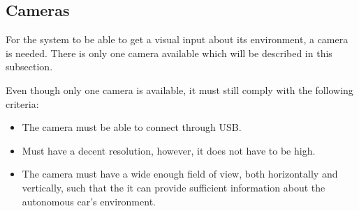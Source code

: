 \subsection{Cameras}\label{ssec:cameras}
For the system to be able to get a visual input about its environment, a camera is needed.
There is only one camera available which will be described in this subsection.

Even though only one camera is available, it must still comply with the following criteria:
\begin{itemize}
  \item The camera must be able to connect through USB.
  \item Must have a decent resolution, however, it does not have to be high.
  \item The camera must have a wide enough field of view, both horizontally and vertically, such that the it can provide sufficient information about the autonomous car’s environment.
\end{itemize}
